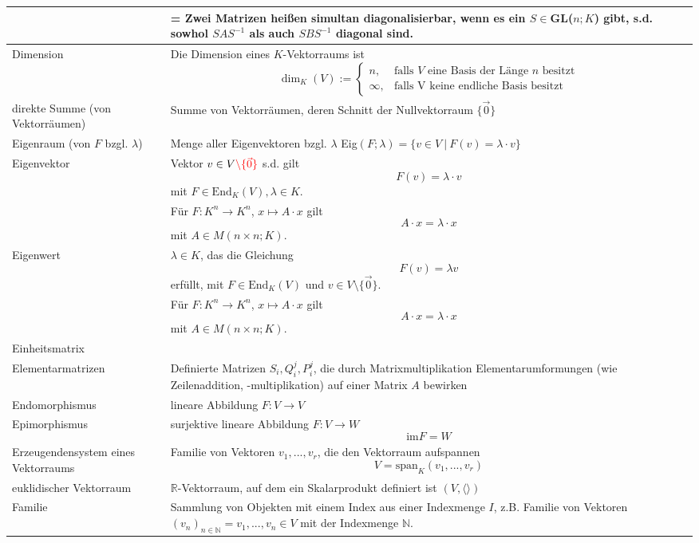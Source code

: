 \documentclass{article}
\begin{document}
\begin{xltabular}{\linewidth}{p{0.33\textwidth}|X}
		&= Zwei Matrizen heißen simultan diagonalisierbar, wenn es ein $S\in$GL($n;K$) gibt, s.d. sowhol $SAS^{-1}$ als auch $SBS^{-1}$ diagonal sind.\\
	\hline
		Dimension & Die Dimension eines $K$-Vektorraums ist
			$$\dim_K(V) := 
			\begin{cases}
				n, & \text{falls $V$ eine Basis der Länge $n$ besitzt} \\
				\infty, & \text{falls V keine endliche Basis besitzt}
			\end{cases}$$ \\
	\hline
		direkte Summe (von Vektorräumen) & Summe von Vektorräumen, deren Schnitt der Nullvektorraum $\{\vec{0}\}$ \\
	\hline
		Eigenraum (von $F$ bzgl. $\lambda$) & Menge aller Eigenvektoren bzgl. $\lambda$ Eig$(F;\lambda) = \{v\in V\ |\ F(v) = \lambda\cdot v\}$\\
	\hline
		Eigenvektor & Vektor $v\in V{\color{red}\setminus\{\vec{0}\}}$ s.d. gilt
			$$F(v) = \lambda\cdot v$$
		mit $F\in \text{End}_K (V), \lambda\in K$.\\
		& Für $F:K^n\to K^n$, $x\mapsto A\cdot x$ gilt
			$$A\cdot x = \lambda \cdot x$$
		mit $A\in M(n\times n; K)$.\\
	\hline
		Eigenwert & $\lambda\in K$, das die Gleichung
			$$F(v) = \lambda v$$
			erfüllt, mit $F\in \text{End}_K(V)$ und $v\in V\setminus\{\vec{0}\}$. \\
		& Für $F:K^n\to K^n$, $x\mapsto A\cdot x$ gilt 
			$$A\cdot x = \lambda \cdot x$$
		mit $A\in M(n\times n; K)$.\\
	\hline
		Einheitsmatrix &  \\
	\hline
		Elementarmatrizen & Definierte Matrizen $S_i, Q_i^j, P_i^j$, die durch Matrixmultiplikation Elementarumformungen (wie Zeilenaddition, -multiplikation) auf einer Matrix $A$ bewirken \\
	\hline
		Endomorphismus & lineare Abbildung $F:V\rightarrow V$ \\
	\hline
		Epimorphismus & surjektive lineare Abbildung $F:V\to W$
			$$\text{im} F = W$$ \\
	\hline
		Erzeugendensystem eines Vektorraums & Familie von Vektoren $v_1,...,v_r$, die den Vektorraum aufspannen
			$$V = \text{span}_K(v_1,...,v_r)$$ \\
	\hline
		euklidischer Vektorraum & $\mathbb{R}$-Vektorraum, auf dem ein Skalarprodukt definiert ist $(V,\langle\rangle)$\\
	\hline
		Familie & Sammlung von Objekten mit einem Index aus einer Indexmenge $I$, z.B. Familie von Vektoren $(v_n)_{n\in \mathbb{N}} = v_1, ..., v_n \in V$ mit der Indexmenge $\mathbb{N}$. \\

\end{xltabular}
\end{document}
